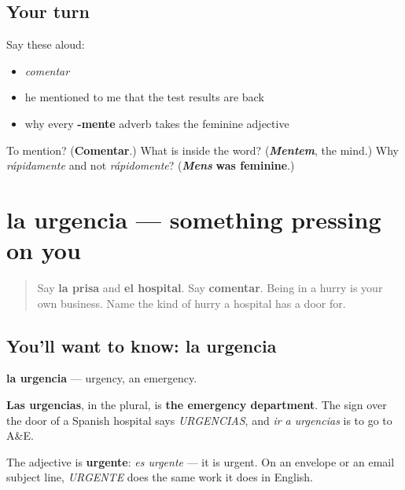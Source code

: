 \subsection*{Your turn}
Say these aloud:

\begin{itemize}
\raggedright
  \item \emph{comentar}
  \item he mentioned to me that the test results are back
  \item why every \textbf{-mente} adverb takes the feminine adjective
\end{itemize}

\begin{tcolorbox}[breakable,colback=teal!4,colframe=teal!35!black,title={Before you move on}]
To mention? (\textbf{Comentar}.) What is inside the word? (\emph{\textbf{Mentem}}, the mind.) Why \emph{rápidamente} and not \emph{rápidomente}? (\emph{\textbf{Mens}} \textbf{was feminine}.)
\end{tcolorbox}
\section[la urgencia]{la urgencia — something pressing on you}

\label{lesson:ES-C447-urgencia}



\begin{quote}
Say \textbf{la prisa} and \textbf{el hospital}. Say \textbf{comentar}. Being in a hurry is your own business. Name the kind of hurry a hospital has a door for.
\end{quote}

\subsection*{You'll want to know: la urgencia}
\textbf{la urgencia} — urgency, an emergency.

\textbf{Las urgencias}, in the plural, is \textbf{the emergency department}. The sign over the door of a Spanish hospital says \emph{URGENCIAS}, and \emph{ir a urgencias} is to go to A\&E.

The adjective is \textbf{urgente}: \emph{es urgente} — it is urgent. On an envelope or an email subject line, \emph{URGENTE} does the same work it does in English.

